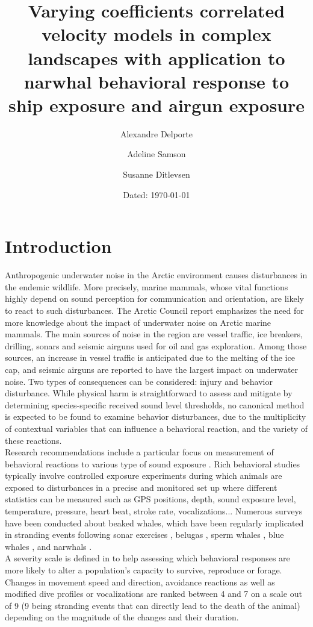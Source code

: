 \documentclass[11pt]{article}
\title{
 \textbf{Varying coefficients correlated velocity models in complex landscapes with application to narwhal behavioral response to ship exposure and airgun exposure}}
\author[1]{Alexandre Delporte}
\author[1]{Adeline Samson}
\author[2]{Susanne Ditlevsen}
\affil[1]{Laboratoire Jean Kuntzmann, Université Grenoble-Alpes, France \authorcr
	\{\tt alexandre.delporte, adeline.samson\}@univ-grenoble-alpes.fr}
\affil[2]{Department of Statistics, University of Copenhagen, Denmark \authorcr
	\tt  susanne@math.ku.dk}
\date{Dated: \today}
\newcommand {\1}{\mathbb{1}}
\theoremstyle{definition}
\theoremstyle{remark}
\theoremstyle{remark}
\begin{document}
\maketitle


\newpage

\section{Introduction}


Anthropogenic underwater noise in the Arctic environment causes disturbances in the endemic wildlife. More precisely, marine mammals, whose vital functions highly depend on sound perception for communication and orientation, are likely to react to such disturbances. The Arctic Council report \cite{halliday_underwater_2020} emphasizes the need for more knowledge about the impact of underwater noise on Arctic marine mammals. The main sources of noise in the region are vessel traffic, ice breakers, drilling, sonars and seismic airguns used for oil and gas exploration. Among those sources, an increase in vessel traffic is anticipated due to the melting of the ice cap, and seismic airguns are reported to have the largest impact on underwater noise. Two types of consequences can be considered: injury and behavior disturbance. While physical harm is straightforward to assess and mitigate by determining species-specific received sound level thresholds, no canonical method is expected to be found to examine behavior disturbances, due to the multiplicity of contextual variables that can influence a behavioral reaction, and the variety of these reactions.\\
Research recommendations include a particular focus on measurement of behavioral reactions to various type of sound exposure \cite{southall_marine_2008,southall_marine_2019}. Rich behavioral studies typically involve controlled exposure experiments during which animals are exposed to disturbances in a precise and monitored set up where different  statistics can be measured such as GPS positions, depth, sound exposure level, temperature, pressure, heart beat, stroke rate, vocalizations... Numerous surveys have been conducted about beaked whales, which have been regularly implicated in stranding events following sonar exercises \cite{tyack_beaked_2011,cioffi_trade-offs_2022}, belugas \cite{martin_exposure_2023}, sperm whales \cite{madsen_quantitative_2006}, blue whales \cite{friedlaender_preymediated_2016}, and narwhals \cite{heide-jorgensen_behavioral_2021,tervo_narwhals_2021}. \\
A severity scale is defined in \cite{southall_marine_2008} to help assessing which behavioral responses are more likely to alter a population's capacity to survive, reproduce or forage. Changes in movement speed and direction, avoidance reactions as well as modified dive profiles or vocalizations  are ranked between 4 and 7 on a scale out of 9 (9 being stranding events that can directly lead to the death of the animal) depending on the magnitude of the changes and their duration.\\
\end{document}
